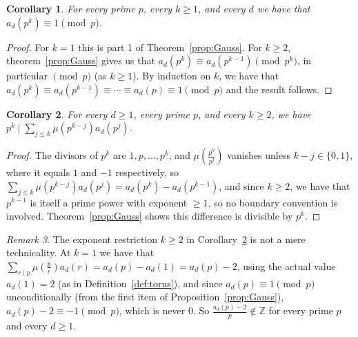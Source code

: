 \documentclass{article}
\theoremstyle{plain}
\newtheorem{theorem}{Theorem}[section]
\newtheorem{corollary}[theorem]{Corollary}
\theoremstyle{definition}
\theoremstyle{remark}
\newtheorem{remark}[theorem]{Remark}
\newcommand{\Z}{\mathbb{Z}}
\begin{document}


\begin{corollary}\label{cor:p_mod_1}
For every prime $p$, every $k \geq 1$, and every $d$ we have that  $a_d(p^k) \equiv 1 \pmod p$.
\end{corollary}
\begin{proof}
For $k=1$ this is part 1 of Theorem~\ref{prop:Gauss}. For $k\ge2$, theorem~\ref{prop:Gauss} gives us that $a_d(p^k)\equiv a_d(p^{k-1})\pmod{p^k}$, in particular $\pmod p$ (as $k\ge1$). By induction on $k$, we have that $a_d(p^k)\equiv a_d(p^{k-1})\equiv\cdots\equiv a_d(p)\equiv1\pmod p$ and the result follows.
\end{proof}


\begin{corollary}\label{cor:zeta-primepower}
For every $d\ge1$, every prime $p$, and every $k\ge2$, we have  $p^k\mid\sum_{j \leq k}\mu(p^{k-j})a_d(p^j)$.
\end{corollary}
\begin{proof}
The divisors of $p^k$ are $1,p,\dots,p^k$, and $\mu(\frac{p^k}{p^j})$ vanishes unless $k-j\in\{0,1\}$, where it equals $1$ and $-1$ respectively, so $\sum_{j \leq k}\mu(p^{k-j})a_d(p^j)=a_d(p^k)-a_d(p^{k-1})$, and since $k\ge2$, we have that $p^{k-1}$ is itself a prime power with exponent $\ge1$, so no boundary convention is involved. Theorem~\ref{prop:Gauss} shows this difference is divisible by $p^k$.
\end{proof}



\begin{remark}\label{rem:k1exception}
The exponent restriction $k\ge2$ in Corollary~\ref{cor:zeta-primepower} is not a mere technicality. At $k=1$ we have that $\sum_{r\mid p}\mu(\frac{p}{r})a_d(r)=a_d(p)-a_d(1)=a_d(p)-2$, using the actual value $a_d(1)=2$ (as in Definition~\ref{def:torus}), and since $a_d(p)\equiv1\pmod p$ unconditionally (from the first item of Proposition~\ref{prop:Gauss}), $a_d(p)-2\equiv-1\pmod p$, which is never $0$. So $\frac{a_d(p)-2}{p}\notin\Z$ for every prime $p$ and every $d\ge1$. %
\end{remark}
\end{document}
